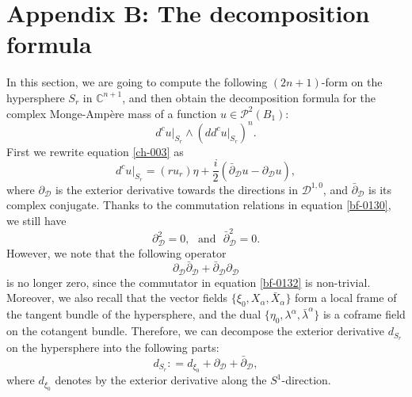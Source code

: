 \documentclass[a4paper,11pt]{amsart}
\numberwithin{equation}{section}
\def\dbar{\bar\partial}
\def\d{\partial}
\def\cP{{\mathcal P}}
\def\cD{{\mathcal D}}
\def\cP{{\mathcal P}}
\def\bC{{\mathbb C}}
\def\a{{\alpha}}
\begin{document}
\section{Appendix B: The decomposition formula}
\smallskip

In this section, 
we are going to compute the following $(2n+1)$-form on the hypersphere $S_r$ in $\bC^{n+1}$, 
and then obtain the decomposition formula for the complex Monge-Amp\`ere mass of a function $u\in \cP^{2}(B_1)$: 
$$ d^cu|_{S_r} \wedge (dd^c u |_{S_r})^n. $$
First we rewrite equation \eqref{ch-003} as 
\begin{equation}
\label{df-001}
d^c u|_{S_r} = (r u_r)\eta + \frac{i}{2} \left( \dbar_{\cD} u - \d_{\cD}u \right), 
\end{equation}
where $\d_{\cD}$ is the exterior derivative towards the directions in $\cD^{1,0}$,
 and $\dbar_{\cD}$ is its complex conjugate. 
Thanks to the commutation relations in equation \eqref{bf-0130},
we still have 
$$ \d_{\cD}^2 =0, \ \ \ \mbox{and} \ \ \ \dbar_{\cD}^2 =0.$$
However, we note that the following operator 
$$\d_{\cD}\dbar_{\cD} + \dbar_{\cD} \d_{\cD}$$ 
is no longer zero, since the commutator in equation \eqref{bf-0132} is non-trivial.  
Moreover, we also recall that the vector fields $\{\xi_0, X_{\a}, \bar{X}_{\a}\}$
form a local frame of the tangent bundle of the hypersphere, 
and the dual $\{ \eta_0, \lambda^{\a}, \bar\lambda^{\a} \}$ is a coframe field on the cotangent bundle. 
Therefore, we can decompose the exterior derivative $d_{S_r}$ on the hypersphere into the following parts: 
\begin{equation}
\label{df-0011}
d_{S_r}: = d_{\xi_0} + \d_{\cD} + \dbar_{\cD}, 
\end{equation}
where $d_{\xi_0}$ denotes by the exterior derivative along the $S^1$-direction. 
\end{document}
